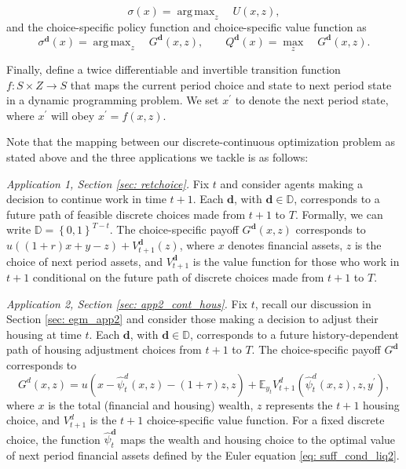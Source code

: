 \documentclass[12pt]{article}
\DeclareMathOperator*{\argmax}{arg\,max}
\newcommand{\DChSet}{\mathbb{D}}
\newcommand{\dVecVar}{\mathbf{d}}
\begin{document}
\begin{equation}
    \sigma(x) = \argmax_{z}\quad U(x,z),
\end{equation}
%
and the choice-specific policy function and choice-specific value function as
%
\begin{equation}
    \sigma^{\dVecVar}(x) = \argmax_{z}\quad  G^{\dVecVar}(x,z),\qquad Q^{\dVecVar}(x) =  \max_{z}\quad  G^{\dVecVar}(x,z).
\end{equation}
	
Finally, define a twice differentiable and invertible transition function $f\colon S\times Z \rightarrow S$ that maps the current period choice and state to next period state in a dynamic programming problem. We set $x^{\prime}$ to denote the next period state, where $x^{\prime}$ will obey $x^{\prime}= f(x,z)$. 

Note that the mapping between our discrete-continuous optimization problem as stated above and the three applications we tackle is as follows:

\emph{Application 1, Section \ref{sec: retchoice}.} Fix $t$ and consider agents making a decision to continue work in time $t+1$. Each $\dVecVar$, with $\dVecVar\in \DChSet$, corresponds to a future path of feasible discrete choices made from $t+1$ to $T$. Formally, we can write  $\DChSet = \left\{0,1\right\}^{T-t}$. The choice-specific payoff $G^{\dVecVar}(x,z)$ corresponds to $u((1+r)x + y - z) + V_{t+1}^{\dVecVar}(z)$, where $x$ denotes financial assets, $z$ is the choice of next period assets, and $V^{\dVecVar}_{t+1}$ is the value function for those who work in $t+1$ conditional on the future path of discrete choices made from $t+1$ to $T$.

\emph{Application 2, Section \ref{sec: app2_cont_hous}.} Fix $t$, recall our discussion in Section \ref{sec: egm_app2} and consider those making a decision to adjust their housing at time $t$. Each $\dVecVar$, with $\dVecVar\in \DChSet$, corresponds to a future history-dependent path of housing adjustment choices from $t+1$ to $T$. The choice-specific payoff $G^{\dVecVar}$ corresponds to
%
\begin{equation*}
G^{d}(x, z) = u(x - \hat{\psi}_{t}^{d}(x,z) - (1+\tau)z,z) + \mathbb{E}_{y_{t}}V_{t+1}^{d}(\hat{\psi}_{t}^{d}(x,z), z, y^{\prime}),
\end{equation*}
%
where $x$ is the total (financial and housing) wealth, $z$ represents the $t+1$ housing choice, and $V^{d}_{t+1}$ is the $t+1$ choice-specific value function. For a fixed discrete choice, the function $\hat{\psi}_{t}^{\dVecVar}$ maps the wealth and housing choice to the optimal value of next period financial assets defined by the Euler equation \eqref{eq: suff_cond_liq2}. 
\end{document}

